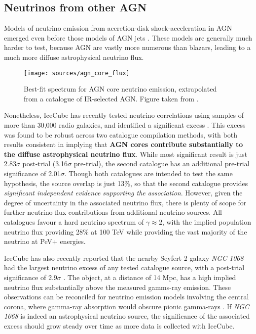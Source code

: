 \subsection*{Neutrinos from other AGN}

Models of neutrino emission from accretion-disk shock-acceleration in AGN emerged even before those models of AGN jets . These models are generally much harder to test, because AGN are vastly more numerous than blazars, leading to a much more diffuse astrophysical neutrino flux. 

\begin{figure}[!ht]
	\centering \texttt{[image: sources/agn\_core\_flux]}
	\caption{Best-fit spectrum for AGN core neutrino emission, extrapolated from a catalogue of IR-selected AGN. Figure taken from \cite{federica_thesis}.}
	\label{fig:agn_core_flux}
\end{figure}

Nonetheless, IceCube has recently tested neutrino correlations using samples of more than 30,000 radio galaxies, and identified a significant excess . This excess was found to be robust across two catalogue compilation methods, with both results consistent in implying that \textbf{AGN cores contribute substantially to the diffuse astrophysical neutrino flux}. While most significant result is just 2.83$\sigma$ post-trial (3.16$\sigma$ pre-trial), the second catalogue has an additional pre-trial significance of 2.01$\sigma$. Though both catalogues are intended to test the same hypothesis, the source overlap is just 13\%, so that the second catalogue provides \emph{significant independent evidence supporting the association}. However, given the degree of uncertainty in the associated neutrino flux, there is plenty of scope for further neutrino flux contributions from additional neutrino sources. All catalogues favour a hard neutrino spectrum of $\gamma \approx 2$, with the implied population neutrino flux providing 28\% at 100 TeV while providing the vast majority of the neutrino at PeV+ energies.

IceCube has also recently reported that the nearby Seyfert 2 galaxy \emph{NGC 1068} had the largest neutrino excess of any tested catalogue source, with a post-trial significance of 2.9$\sigma$ . The object, at a distance of 14 Mpc, has a high implied neutrino flux substantially above the measured gamms-ray emission. These observations can be reconciled for neutrino emission models involving the central corona, where gamma-ray absorption would obscure pionic gamma-rays . If \emph{NGC 1068} is indeed an astrophysical neutrino source, the significance of the associated excess should grow steady over time as more data is collected with IceCube.


